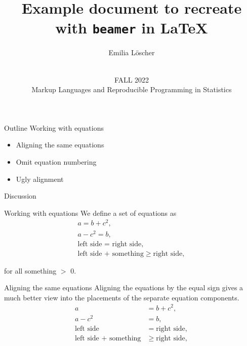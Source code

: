 \documentclass[aspectratio=169]{beamer}
\begin{document}
\title{Example document to recreate with \texttt{beamer} in \LaTeX}
\author{Emilia Löscher}
\date[My data]{\vspace{1cm} \\\large FALL 2022\\ \large Markup Languages and Reproducible Programming in Statistics}


\maketitle


\begin{frame}{Outline}
  Working with equations \\
  \begin{itemize}
     \item[]  Aligning the same equations\\
  \item[] Omit equation numbering \\
  \item[] Ugly alignment\\
  \end{itemize}
 
 \vspace{1 cm} 
  Discussion
\end{frame}

\begin{frame}{Working with equations}
We define a set of equations as
\begin{gather}
    a = b + c^2,\\
    a - c^2 = b,\\
    \text{left side = right side},\\
    \text{left side + something} \geq \text{right side},
\end{gather}


for all something $>$ 0.    
\end{frame}

\begin{frame}{Aligning the same equations}
Aligning the equations by the equal sign gives a much better view into the placements
of the separate equation components.
\begin{align}
    a &= b + c^2,\\
    a - c^2 &= b,\\
    \text{left side} &= \text{right side},\\
    \text{left side + something} &\geq \text{right side},
\end{align}
    
\end{frame}
\end{document}
